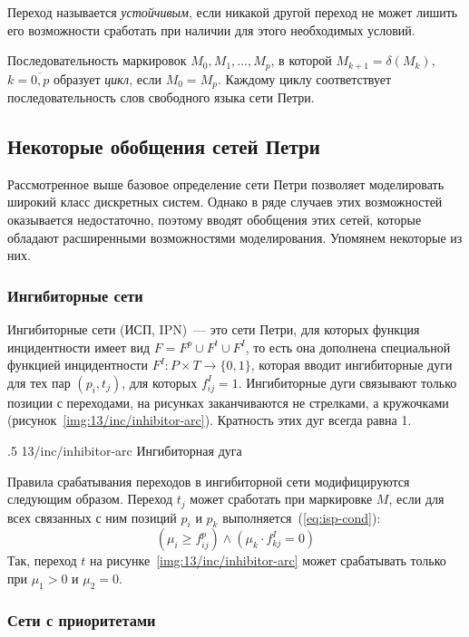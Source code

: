 Переход называется \textit{устойчивым}, если никакой другой переход не может лишить его возможности сработать при наличии для этого необходимых условий. 

Последовательность маркировок ${M_0, M_1, \dots, M_p}$, в которой ${M_{k + 1} = \delta(M_k)}$, ${k = \overline{0, p}}$ образует \textit{цикл}, если ${M_0 = M_p}$. Каждому циклу соответствует последовательность слов свободного языка сети Петри.

\subsection{Некоторые обобщения сетей Петри}

Рассмотренное выше базовое определение сети Петри позволяет моделировать широкий класс дискретных систем. Однако в ряде случаев этих возможностей оказывается недостаточно, поэтому вводят обобщения этих сетей, которые обладают расширенными возможностями моделирования. Упомянем некоторые из них.

\subsubsection{Ингибиторные сети}

Ингибиторные сети (ИСП, IPN)~--- это сети Петри, для которых функция инцидентности имеет вид ${F = F^p\cup F^t\cup F^I}$, то есть она дополнена специальной функцией инцидентности ${F^I\colon P\times T\rightarrow \{ 0, 1 \}}$, которая вводит ингибиторные дуги для тех пар ${(p_i, t_j)}$, для которых ${f_{ij}^I = 1}$. Ингибиторные дуги связывают только позиции с переходами, на рисунках заканчиваются не стрелками, а кружочками (рисунок~\ref{img:13/inc/inhibitor-arc}). Кратность этих дуг всегда равна 1.

\image
{.5\textwidth}
{13/inc/inhibitor-arc}
{Ингибиторная дуга}

Правила срабатывания переходов в ингибиторной сети модифицируются следующим образом. Переход $t_j$ может сработать при маркировке $M$, если для всех связанных с ним позиций $p_i$ и $p_k$ выполняется~(\ref{eq:isp-cond}):
%
\begin{equation}
    \label{eq:isp-cond}
    (\mu_i\geqslant f_{ij}^p)\wedge(\mu_k\cdot f_{kj}^I = 0)
\end{equation}
%
Так, переход $t$ на рисунке~\ref{img:13/inc/inhibitor-arc} может срабатывать только при ${\mu_1 > 0}$ и ${\mu_2 = 0}$.

\subsubsection{Сети с приоритетами}

